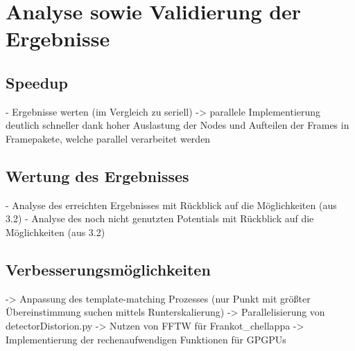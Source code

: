 \chapter{Analyse sowie Validierung der Ergebnisse}

\section{Speedup}

\begin{correctmore}
	- Ergebnisse werten (im Vergleich zu seriell)
	-> parallele Implementierung deutlich schneller dank hoher Auslastung der Nodes und Aufteilen der Frames in Framepakete, welche parallel verarbeitet werden
\end{correctmore}
\section{Wertung des Ergebnisses}

\begin{correctmore}
	- Analyse des erreichten Ergebnisses mit Rückblick auf die Möglichkeiten (aus 3.2)
	- Analyse des noch nicht genutzten Potentials mit Rückblick auf die Möglichkeiten (aus 3.2)
\end{correctmore}

\section{Verbesserungsmöglichkeiten}

\begin{correctmore}
	-> Anpassung des template-matching Prozesses (nur Punkt mit größter Übereinstimmung suchen mittels Runterskalierung)
	-> Parallelisierung von detectorDistorion.py
	-> Nutzen von FFTW für Frankot\_chellappa
	-> Implementierung der rechenaufwendigen Funktionen für GPGPUs
\end{correctmore}
